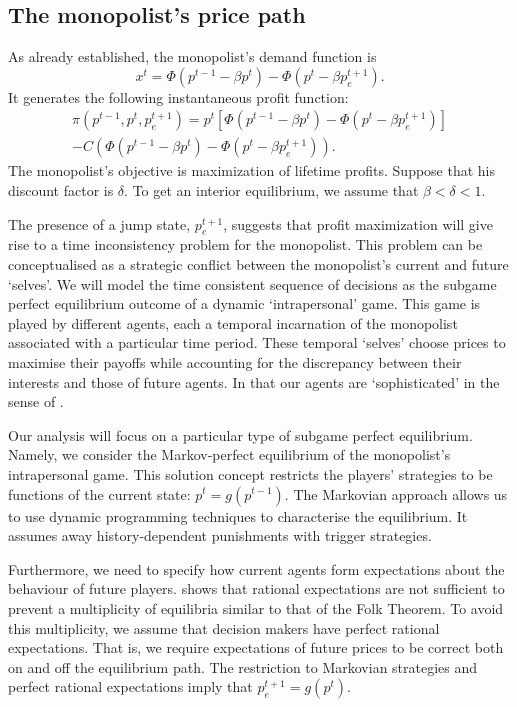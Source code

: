 \subsection{The monopolist's price path}

\label{sec:monop-price-path}

As already established, the monopolist's demand function is 
\begin{equation}
x^{t}=\Phi (p^{t-1}-\beta p^{t})-\Phi (p^{t}-\beta p_{e}^{t+1})\text{.}
\end{equation}%
It generates the following instantaneous profit function: 
\begin{multline}
\pi (p^{t-1},p^{t},p_{e}^{t+1})=p^{t}\left[ \Phi (p^{t-1}-\beta p^{t})-\Phi
(p^{t}-\beta p_{e}^{t+1})\right]  \\
-C\left( \Phi (p^{t-1}-\beta p^{t})-\Phi (p^{t}-\beta p_{e}^{t+1})\right) .
\label{eq:9}
\end{multline}%
The monopolist's objective is maximization of lifetime profits. Suppose that
his discount factor is $\delta $. To get an interior equilibrium, we assume
that $\beta <\delta <1$.

The presence of a jump state, $p_{e}^{t+1}$, suggests that profit
maximization will give rise to a time inconsistency problem for the
monopolist. This problem can be conceptualised as a strategic conflict
between the monopolist's current and future `selves'. We will model the time
consistent sequence of decisions as the subgame perfect equilibrium outcome
of a dynamic `intrapersonal' game. This game is played by different agents,
each a temporal incarnation of the monopolist associated with a particular
time period. These temporal `selves' choose prices to maximise their payoffs
while accounting for the discrepancy between their interests and those of
future agents. In that our agents are `sophisticated' in the sense of %
\citet{Donoghue2001}.

Our analysis will focus on a particular type of subgame perfect equilibrium.
Namely, we consider the Markov-perfect equilibrium of the monopolist's
intrapersonal game. This solution concept restricts the players' strategies
to be functions of the current state: $p^{t}=g(p^{t-1})$. The Markovian
approach allows us to use dynamic programming techniques to characterise the
equilibrium. It assumes away history-dependent punishments with trigger
strategies.

Furthermore, we need to specify how current agents form expectations about
the behaviour of future players. \citet{Stokey1981} shows that rational
expectations are not sufficient to prevent a multiplicity of equilibria
similar to that of the Folk Theorem. To avoid this multiplicity, we assume
that decision makers have perfect rational expectations. That is, we require
expectations of future prices to be correct both on and off the equilibrium
path. The restriction to Markovian strategies and perfect rational
expectations imply that $p_{e}^{t+1}=g(p^{t})$.

